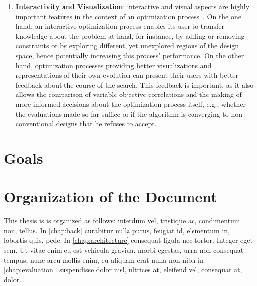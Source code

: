 \begin{enumerate}
\item \textbf{Interactivity and Visualization}: interactive and visual aspects are highly important features in the context of an optimization process~\cite{Ashour2015CreativelyMOO}. On the one hand, an interactive optimization process enables its user to transfer knowledge about the problem at hand, for instance, by adding or removing constraints or by exploring different, yet unexplored regions of the design space, hence potentially increasing this process' performance. On the other hand, optimization processes providing better visualizations and representations of their own evolution can present their users with better feedback about the course of the search. This feedback is important, as it also allows the comparison of variable-objective correlations and the making of more informed decisions about the optimization process itself, e.g., whether the evaluations made so far suffice or if the algorithm is converging to non-conventional designs that he refuses to accept.
\end{enumerate}
	

\section{Goals}



\section{Organization of the Document}
This thesis is is organized as follows:  interdum vel, tristique ac, condimentum non, tellus. 
In \cref{chap:back} curabitur nulla purus, feugiat id, elementum in, lobortis quis, pede.
In \cref{chap:architecture} consequat ligula nec tortor. Integer eget sem. Ut vitae enim eu est vehicula gravida.
 morbi egestas, urna non consequat tempus, nunc arcu mollis enim, eu aliquam erat nulla non nibh in \cref{chap:evaluation}.
 suspendisse dolor nisl, ultrices at, eleifend vel, consequat at, dolor.





